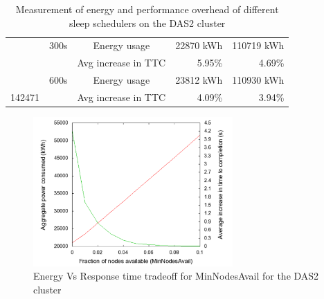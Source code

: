 \begin{table}
\begin{tabular}{|c|c|c|r|r|}
        & 300s & Energy usage & 22870 kWh & 110719 kWh \\\cline{3-5}
        & & Avg increase in TTC & 5.95\% & 4.69\% \\\cline{2-5}
        
        & 600s & Energy usage & 23812 kWh & 110930 kWh \\\cline{3-5}142471
        & & Avg increase in TTC & 4.09\% & 3.94\% \\\cline{2-5}
        \hline
    \end{tabular}
    \caption{Measurement of energy and performance overhead of different sleep schedulers on the DAS2 cluster}
    \label{tab:sleep-overhead}
\end{table}

\begin{figure}[ht]
\centering
\begin{center}
\includegraphics[width=3.0in]{graphs/ttcvsenergy.pdf}
\vspace{-0.1in}
\caption{{\normalsize Energy Vs Response time tradeoff for MinNodesAvail for the DAS2 cluster}\label{fig:ttc-energy}}
\vspace{-0.1in}
\end{center}
\end{figure}


